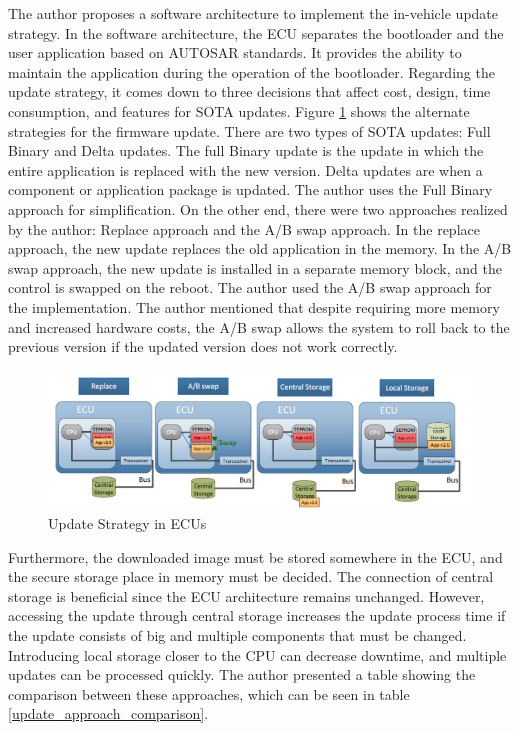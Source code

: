 \documentclass[12pt,a4paper]{article}
\begin{document}
The author proposes a software architecture to implement the in-vehicle update strategy. In the software architecture, the ECU separates the bootloader and the user application based on AUTOSAR standards. It provides the ability to maintain the application during the operation of the bootloader. Regarding the update strategy, it comes down to three decisions that affect cost, design, time consumption, and features for SOTA updates. Figure \ref{update_strategy} shows the alternate strategies for the firmware update. There are two types of SOTA updates: Full Binary and Delta updates. The full Binary update is the update in which the entire application is replaced with the new version. Delta updates are when a component or application package is updated. The author uses the Full Binary approach for simplification. On the other end, there were two approaches realized by the author: Replace approach and the A/B swap approach. In the replace approach, the new update replaces the old application in the memory. In the A/B swap approach, the new update is installed in a separate memory block, and the control is swapped on the reboot. The author used the A/B swap approach for the implementation. The author mentioned that despite requiring more memory and increased hardware costs, the A/B swap allows the system to roll back to the previous version if the updated version does not work correctly. \cite{r28}

\begin{figure}[H]
\centering
\includegraphics[scale=0.5]{update_strategy.PNG}
\caption{Update Strategy in ECUs \cite{r28}}
\label{update_strategy}
\end{figure}

Furthermore, the downloaded image must be stored somewhere in the ECU, and the secure storage place in memory must be decided. The connection of central storage is beneficial since the ECU architecture remains unchanged. However, accessing the update through central storage increases the update process time if the update consists of big and multiple components that must be changed. Introducing local storage closer to the CPU can decrease downtime, and multiple updates can be processed quickly. The author presented a table showing the comparison between these approaches, which can be seen in table \ref{update_approach_comparison}. \cite{r28} \\
\end{document}

